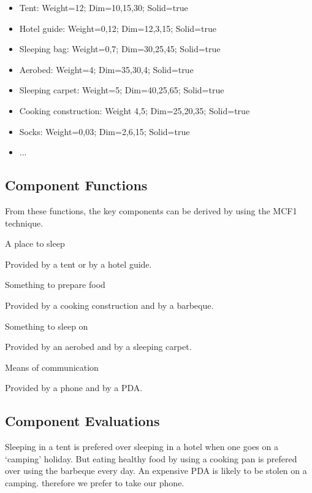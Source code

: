 \documentclass[a4paper,11pt]{article}
\begin{document}
\begin{itemize}
\item Tent: Weight=12; Dim=10,15,30; Solid=true
\item Hotel guide: Weight=0,12; Dim=12,3,15; Solid=true
\item Sleeping bag: Weight=0,7; Dim=30,25,45; Solid=true
\item Aerobed: Weight=4; Dim=35,30,4; Solid=true
\item Sleeping carpet: Weight=5; Dim=40,25,65; Solid=true
\item Cooking construction: Weight 4,5; Dim=25,20,35; Solid=true
\item Socks: Weight=0,03; Dim=2,6,15; Solid=true
\item ...
\end{itemize}


\subsection*{Component Functions}

From these functions, the key components can be derived by using
the MCF1 technique.

\begin{description}

\item{A place to sleep}

Provided by a tent or by a hotel guide.

\item{Something to prepare food}

Provided by a cooking construction and by a barbeque.

\item{Something to sleep on}

Provided by an aerobed and by a sleeping carpet.

\item{Means of communication}

Provided by a phone and by a PDA.

\end{description}


\subsection*{Component Evaluations}

Sleeping in a tent is prefered over sleeping in a hotel
when one goes on a `camping' holiday. But eating healthy
food by using a cooking pan is prefered over using the
barbeque every day. An expensive PDA is likely to be stolen
on a camping. therefore we prefer to take our phone.
\end{document}
